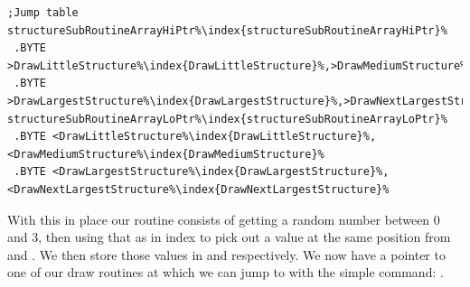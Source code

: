 \begin{lstlisting}[escapechar=\%,caption=A 'jump table' containing the addresses to our draw routines. The address for \icode{DrawLittleStructure\index{DrawLittleStructure}}
happens to be \$7486\, so we store \$74 in the first byte of \icode{structureSubRoutineArrayHiPtr\index{structureSubRoutineArrayHiPtr}} and \$86 in the first
byte of \icode{structureSubRoutineArrayLoPtr\index{structureSubRoutineArrayLoPtr}}.]
;Jump table
structureSubRoutineArrayHiPtr%\index{structureSubRoutineArrayHiPtr}% 
 .BYTE >DrawLittleStructure%\index{DrawLittleStructure}%,>DrawMediumStructure%\index{DrawMediumStructure}%
 .BYTE >DrawLargestStructure%\index{DrawLargestStructure}%,>DrawNextLargestStructure%\index{DrawNextLargestStructure}%
structureSubRoutineArrayLoPtr%\index{structureSubRoutineArrayLoPtr}% 
 .BYTE <DrawLittleStructure%\index{DrawLittleStructure}%,<DrawMediumStructure%\index{DrawMediumStructure}%
 .BYTE <DrawLargestStructure%\index{DrawLargestStructure}%,<DrawNextLargestStructure%\index{DrawNextLargestStructure}%
\end{lstlisting}

With this in place our routine consists of getting a random number between 0 and 3, then using that as in index to pick
out a value at the same position from  and .
We then store those values in  and  respectively. We now
have a pointer to one of our draw routines at  which we can jump to with the simple
command: . 


